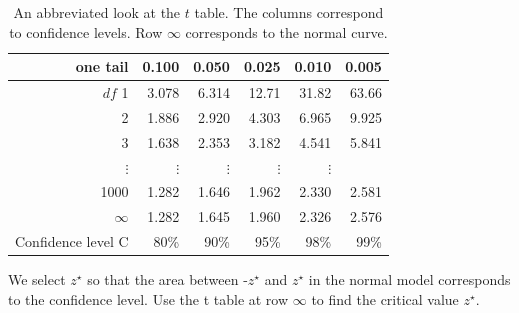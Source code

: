 \begin{table}[hht]
\centering
\begin{tabular}{r | rrr rr}
one tail & \hspace{1.5mm}  0.100 & \hspace{1.5mm} 0.050 & \hspace{1.5mm} 0.025 & \hspace{1.5mm} 0.010 & \hspace{1.5mm} 0.005  \\
\hline
{$df$} \hfill 1  &  {\normalsize  3.078} & {\normalsize  6.314} & {\normalsize 12.71} & {\normalsize 31.82} & {\normalsize 63.66}  \\ 
2  &  {\normalsize  1.886} & {\normalsize  2.920} & {\normalsize  4.303} & {\normalsize  6.965} & {\normalsize  9.925}  \\ 
3  &  {\normalsize  1.638} & {\normalsize  2.353} & {\normalsize  3.182} & {\normalsize  4.541} & {\normalsize  5.841}  \\ 
$\vdots$ & $\vdots$ &$\vdots$ &$\vdots$ &$\vdots$ & \\
1000  &  {\normalsize  1.282} & {\normalsize  1.646} & {\normalsize  1.962} & {\normalsize  2.330} & {\normalsize  2.581}  \\ 
$\infty$   &  {\normalsize  1.282} & {\normalsize  1.645} & {\normalsize  1.960} & {\normalsize  2.326} & {\normalsize  2.576}   \\
\hline
Confidence level C  &  {\normalsize  80\%} & {\normalsize 90\%} & {\normalsize 95\%} & {\normalsize  98\%} & {\normalsize  99\%}  \\
\hline
\end{tabular}
\caption{An abbreviated look at the $t$ table. The columns correspond to confidence levels. Row $\infty$ corresponds to the normal curve.}
\label{tTableSample}
\end{table}


\begin{tipBox}{
We select $z^{\star}$ so that the area between -$z^{\star}$ and $z^{\star}$ in the normal model corresponds to the confidence level. Use the t table at row $\infty$ to find the critical value $z^{\star}$.}
\end{tipBox}

